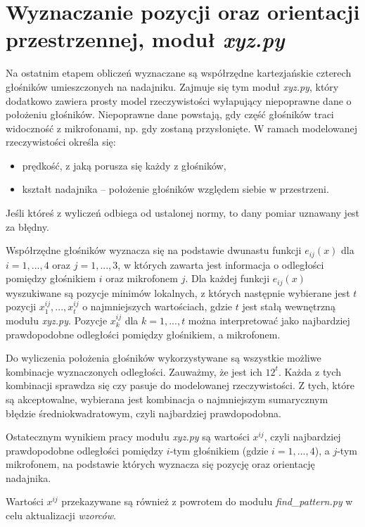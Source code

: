  
\section{Wyznaczanie pozycji oraz orientacji przestrzennej, moduł \textit{xyz.py}}

Na ostatnim etapem obliczeń wyznaczane są współrzędne kartezjańskie czterech głośników umieszczonych na nadajniku.
Zajmuje się tym moduł \textit{xyz.py}, który dodatkowo zawiera prosty model rzeczywistości
wyłapujący niepoprawne dane o położeniu głośników.
Niepoprawne dane powstają, gdy część głośników traci widoczność z mikrofonami, np. gdy zostaną przysłonięte.
W ramach modelowanej rzeczywistości określa się:
\begin{itemize}
  \item prędkość, z jaką porusza się każdy z głośników,
  \item kształt nadajnika -- położenie głośników względem siebie w przestrzeni.
\end{itemize}
Jeśli któreś z wyliczeń odbiega od ustalonej normy, to dany pomiar uznawany jest za błędny.


Współrzędne głośników wyznacza się na podstawie dwunastu funkcji $e_{ij}(x)$ dla $i=1, ..., 4$ oraz $j=1, ..., 3$,
w których zawarta jest informacja o odległości pomiędzy głośnikiem $i$ oraz mikrofonem $j$.
Dla każdej funkcji $e_{ij}(x)$ wyszukiwane są pozycje minimów lokalnych, 
z których następnie wybierane jest $t$ pozycji $x^{ij}_1, ..., x^{ij}_t$
o najmniejszych wartościach, gdzie $t$ jest stałą wewnętrzną modułu \textit{xyz.py}.
Pozycje $x^{ij}_k$ dla $k=1, ..., t$  można interpretować jako najbardziej prawdopodobne odległości pomiędzy głośnikiem, a mikrofonem.

Do wyliczenia położenia głośników wykorzystywane są wszystkie możliwe kombinacje wyznaczonych odległości.
Zauważmy, że jest ich $12^t$. Każda z tych kombinacji 
sprawdza się czy pasuje do modelowanej rzeczywistości. Z tych, które są akceptowalne, wybierana jest 
kombinacja o najmniejszym sumarycznym błędzie średniokwadratowym, czyli najbardziej prawdopodobna.

Ostatecznym wynikiem pracy modułu \textit{xyz.py} są wartości $x^{ij}$, czyli najbardziej prawdopodobne odległości
pomiędzy  $i$-tym głośnikiem (gdzie $i=1,...,4$), a $j$-tym mikrofonem, na podstawie których 
wyznacza się  pozycję oraz orientację nadajnika.

Wartości $x^{ij}$ przekazywane są również z powrotem do modułu \textit{find\_pattern.py} w celu aktualizacji \textit{wzorców}.


